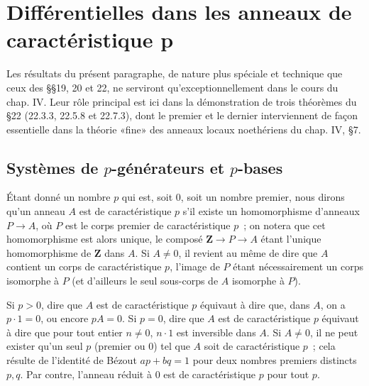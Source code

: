 \section{Différentielles dans les anneaux de caractéristique p}
Les résultats du présent paragraphe, de nature plus spéciale et technique que
ceux des §§19, 20 et 22, ne serviront qu'exceptionnellement dans le cours du
chap. IV. Leur rôle principal est ici dans la démonstration de trois théorèmes
du §22 (22.3.3, 22.5.8 et 22.7.3), dont le premier et le dernier interviennent
de façon essentielle dans la théorie «fine» des anneaux locaux noethériens du
chap. IV, §7.
\subsection{Systèmes de $p$-générateurs et $p$-bases}
\label{0.21.1-fr}

\begin{env}[21.1.1]
\label{0.21.1.1-fr}
Étant donné un nombre $p$ qui est, soit $0$, soit un nombre premier, nous
dirons qu'un anneau $A$ est de caractéristique $p$ s'il existe un homomorphisme
d'anneaux $P\to A$, où $P$ est le corps premier de caractéristique $p$~; on
notera que cet homomorphisme est alors unique, le composé
$\mathbf Z\to P\to A$ étant l'unique homomorphisme de $\mathbf Z$ dans $A$.
Si $A\neq0$, il revient au même de dire que $A$ contient un corps de
caractéristique $p$, l'image de $P$ étant nécessairement un corps isomorphe à
$P$ (et d'ailleurs le seul sous-corps de $A$ isomorphe à $P$).
\end{env}

\begin{env}[21.1.2]
\label{0.21.1.2-fr}
Si $p>0$, dire que $A$ est de caractéristique $p$ équivaut à dire que, dans
$A$, on a $p\cdot1=0$, ou encore $pA=0$. Si $p=0$, dire que $A$ est de
caractéristique $p$ équivaut à dire que pour tout entier $n\neq0$, $n\cdot1$
est inversible dans $A$. Si $A\neq0$, il ne peut exister qu'un seul $p$
(premier ou $0$) tel que $A$ soit de caractéristique $p$~; cela résulte de
l'identité de Bézout $ap+bq=1$ pour deux nombres premiers distincts $p,q$.
Par contre, l'anneau réduit à $0$ est de caractéristique $p$ pour tout $p$.
\end{env}

